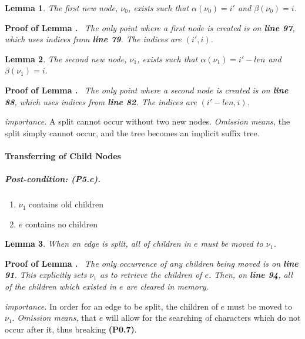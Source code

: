 \documentclass{article}
\newtheorem{lemma}{Lemma}[section]
\newenvironment{proof}{\par\noindent\textbf{Proof of Lemma \thelemma.}\ \itshape}{\par}
\begin{document}
	\begin{lemma}
		The first new node, $\nu_0$, exists such that $\alpha(\nu_0) = i\prime$ and $\beta(\nu_0) = i$.
	\end{lemma}
	\begin{proof}
		The only point where a first node is created is on \textbf{line 97}, which uses indices from \textbf{line 79}.  The indices are $(i\prime, i)$.
	\end{proof}
	
	\begin{lemma}
		The second new node, $\nu_1$, exists such that $\alpha(\nu_1) = i\prime - len$ and $\beta(\nu_1) = i$.
	\end{lemma}
	\begin{proof}
		The only point where a second node is created is on \textbf{line 88}, which uses indices from \textbf{line 82}.  The indices are $(i\prime - len, i)$.
	\end{proof}
	
	\textit{importance.}  A split cannot occur without two new nodes.
	\textit{Omission means,} the split simply cannot occur, and the tree becomes an implicit suffix tree.
		
	\paragraph{Transferring of Child Nodes}	
	\subparagraph{Post-condition: (P5.c).}
	\begin{enumerate}[label=(P5.c.\arabic*), ref=(P3.a.\arabic*)]
		\item $\nu_1$ contains old children
		\item $e$ contains no children
	\end{enumerate}

	\begin{lemma}
		When an edge is split, all of children in $e$ must be moved to $\nu_1$.
	\end{lemma}
	\begin{proof}
		The only occurrence of any children being moved is on \textbf{line 91}.  This explicitly sets $\nu_1$ as to retrieve the children of $e$.  Then, on \textbf{line 94}, all of the children which existed in $e$ are cleared in memory.
	\end{proof}
	
	\textit{importance.} In order for an edge to be split, the children of $e$ must be moved to $\nu_1$.
	\textit{Omission means, } that $e$ will allow for the searching of characters which do not occur after it, thus breaking \textbf{(P0.7)}.
	
\end{document}
